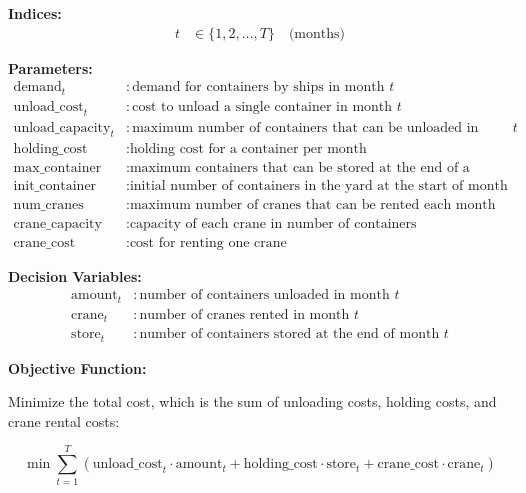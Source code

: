 \documentclass{article}
\begin{document}
\textbf{Indices:}
\begin{align*}
t & \in \{1, 2, \ldots, T\} \quad \text{(months)}
\end{align*}

\textbf{Parameters:}
\begin{align*}
\text{demand}_{t} & : \text{demand for containers by ships in month } t \\
\text{unload\_cost}_{t} & : \text{cost to unload a single container in month } t \\
\text{unload\_capacity}_{t} & : \text{maximum number of containers that can be unloaded in month } t \\
\text{holding\_cost} & : \text{holding cost for a container per month} \\
\text{max\_container} & : \text{maximum containers that can be stored at the end of a month} \\
\text{init\_container} & : \text{initial number of containers in the yard at the start of month 1} \\
\text{num\_cranes} & : \text{maximum number of cranes that can be rented each month} \\
\text{crane\_capacity} & : \text{capacity of each crane in number of containers} \\
\text{crane\_cost} & : \text{cost for renting one crane}
\end{align*}

\textbf{Decision Variables:}
\begin{align*}
\text{amount}_{t} & : \text{number of containers unloaded in month } t \\
\text{crane}_{t} & : \text{number of cranes rented in month } t \\
\text{store}_{t} & : \text{number of containers stored at the end of month } t
\end{align*}

\textbf{Objective Function:}

Minimize the total cost, which is the sum of unloading costs, holding costs, and crane rental costs:

\[
\min \sum_{t=1}^{T} \left( \text{unload\_cost}_{t} \cdot \text{amount}_{t} + \text{holding\_cost} \cdot \text{store}_{t} + \text{crane\_cost} \cdot \text{crane}_{t} \right)
\]
\end{document}

